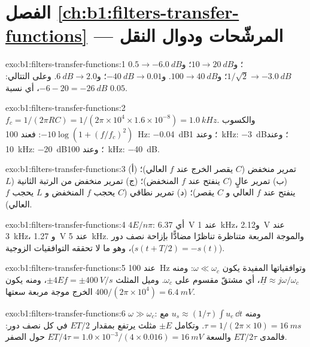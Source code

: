 \section*{الفصل \ref{ch:b1:filters-transfer-functions} --- المرشّحات ودوال النقل}

\begin{solution}{exo:b1:filters-transfer-functions:1}
$0.5 \to \qty{-6.0}{dB}$؛ و$10 \to \qty{20}{dB}$؛ و$1/\sqrt2 \to \qty{-3.0}{dB}$؛
و$100 \to \qty{40}{dB}$. و$\qty{-40}{dB} \to 0.01$؛ و$\qty{+6}{dB} \to 2.0$.
وعلى التتالي: $-6 - 20 = \qty{-26}{dB}$، أي نسبة $0.05$.
\end{solution}

\begin{solution}{exo:b1:filters-transfer-functions:2}
$f_c = 1/(2\pi RC) = 1/(2\pi \times 10^4 \times 1.6\times10^{-8}) =
\qty{1.0}{kHz}$. والكسوب $-10\log(1 + (f/f_c)^2)$: فعند \qty{100}{Hz}:
\qty{-0.04}{dB}؛ وعند \qty{1}{kHz}: \qty{-3}{dB}؛ وعند \qty{10}{kHz}: \qty{-20}{dB}؛
وعند \qty{100}{kHz}: \qty{-40}{dB}.
\end{solution}

\begin{solution}{exo:b1:filters-transfer-functions:3}
(أ) تمرير منخفض ($C$ يقصر الخرج عند $f$ العالي)؛ (ب) تمرير عالٍ ($C$
ينفتح عند $f$ المنخفض)؛ (ج) تمرير منخفض من الرتبة الثانية ($L$ ينفتح عند $f$ العالي و
$C$ يقصر)؛ (د) تمرير نطاقي ($C$ يحجب $f$ المنخفض و $L$ يحجب $f$ العالي).
\end{solution}

\begin{solution}{exo:b1:filters-transfer-functions:4}
$4E/n\pi$: أي \qty{6.37}{V} عند \qty{1}{kHz}، و\qty{2.12}{V} عند \qty{3}{kHz}، و
\qty{1.27}{V} عند \qty{5}{kHz}. والموجة المربعة متناظرة تناظرًا مضادًّا
بإزاحة نصف دور ($s(t + T/2) = -s(t)$)، وهو ما لا تحققه التوافقيات
الزوجية.
\end{solution}

\begin{solution}{exo:b1:filters-transfer-functions:5}
عند \qty{100}{Hz} وتوافقياتها المفيدة يكون $\omega \ll \omega_c$:
ومنه $\underline H \approx j\omega/\omega_c$، أي مشتقّ مقسوم على
$\omega_c$. وميل المثلث $\pm 4Ef = \pm\qty{400}{V/s}$، ومنه
يكون الخرج موجة مربعة سعتها $400/(2\pi \times 10^4) =
\qty{6.4}{mV}$.
\end{solution}

\begin{solution}{exo:b1:filters-transfer-functions:6}
$\omega \gg \omega_c$: ومنه $u_s \approx (1/\tau)\int u_e\,\dd t$ مع $\tau =
1/(2\pi \times 10) = \qty{16}{ms}$. وتكامل $\pm E$ مثلث
يرتفع بمقدار $ET/2$ في كل نصف دور: فالمدى $ET/2\tau$ والسعة
$ET/4\tau = 1.0 \times 10^{-3}/(4 \times 0.016) = \qty{16}{mV}$ حول
الصفر.
\end{solution}

